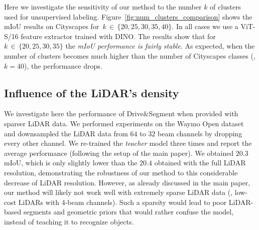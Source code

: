 \documentclass[runningheads]{llncs}
\newcommand{\ours}{Drive$\&$Segment\xspace}
\begin{document}
Here we investigate the sensitivity of our method to the number $k$ of clusters used for unsupervised labeling.
Figure~\ref{fig:num_clusters_comparison} shows the mIoU results on Cityscapes for~$k\,{\in}\,\{20,25,30,35,40\}$. 
In all cases we use a ViT-S/16 feature extractor trained with DINO.
The results show that for $k\,{\in}\,\{20,25,30,35\}$ the \emph{mIoU performance is fairly stable}.
As expected, when the number of clusters becomes much higher than the number of Cityscapes classes (\eg, $k=40$), the performance drops.

\subsection{Influence of the LiDAR's density}
\label{sec:lidar_density_ablation}
We investigate here the performance of \ours when provided with sparser LiDAR data. We performed experiments on the Waymo Open dataset and downsampled the LiDAR data from $64$ to $32$ beam channels by dropping every other channel. We re-trained the \emph{teacher} model three times and report the average performance (following the setup of the main paper). 
We obtained $20.3$ mIoU, which is only slightly lower than the $20.4$ obtained with the full LiDAR resolution, demonstrating the robustness of our method to this considerable decrease of LiDAR resolution.
However, as already discussed in the main paper, our method will likely not work well with extremely sparse LiDAR data (\eg, low-cost LiDARs with 4-beam channels). 
Such a sparsity would lead to poor LiDAR-based segments and geometric priors that would rather confuse the model, instead of teaching it to recognize objects.
\end{document}
